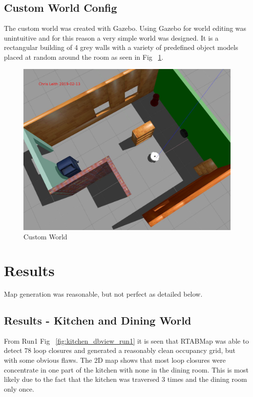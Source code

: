 \documentclass[10pt,journal,compsoc]{IEEEtran}
\begin{document}
\subsection{Custom World Config}
The custom world was created with Gazebo. Using Gazebo for world editing was unintuitive and for this reason a very simple world was designed. It is a rectangular building of 4 grey walls with a variety of predefined object models placed at random around the room as seen in Fig ~\ref{fig:customworld}.

\begin{figure}[h]
      \centering
      \includegraphics[width=\linewidth]{Assets/custom_gazebo_world.jpg}
      \caption{Custom World}
      \label{fig:customworld}
\end{figure}

\section{Results}
Map generation was reasonable, but not perfect as detailed below.
\subsection{Results - Kitchen and Dining World}
From Run1 Fig ~\ref{fig:kitchen_dbview_run1} it is seen that RTABMap was able to detect 78 loop closures and generated a reasonably clean occupancy grid, but with some obvious flaws. The 2D map shows that most loop closures were concentrate in one part of the kitchen with none in the dining room. This is most likely due to the fact that the kitchen was traversed 3 times and the dining room only once.
\end{document}
